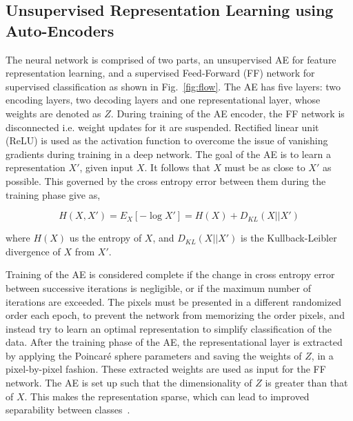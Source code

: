 \subsection{Unsupervised Representation Learning using Auto-Encoders}
\label{sec:AE_A5x}
The neural network is comprised of two parts, an unsupervised AE for feature representation learning, and a supervised Feed-Forward (FF) network for supervised classification as shown in Fig.~\ref{fig:flow}. 
%
The AE has five layers: two encoding layers, two decoding layers and one representational layer, whose weights are denoted as $Z$. During training of the AE encoder, the FF network is disconnected i.e. weight updates for it are suspended. Rectified linear unit (ReLU) is used as the activation function to overcome the issue of vanishing gradients during training in a deep network.
%
The goal of the AE is to learn a representation $X'$, given input $X$. It follows that $X$ must be as close to $X'$ as possible. This governed by the cross entropy error between them during the training phase give as,

\begin{equation}
H(X,X') = E_X[-\log X'] = H(X) + D_{KL}(X||X')
\end{equation}

where $H(X)$ us the entropy of $X$, and $D_{KL}(X||X')$ is the  Kullback-Leibler divergence of $X$ from $X'$.

Training of the AE is considered complete if the  change in cross entropy error between successive iterations is negligible, or if the maximum number of iterations are exceeded. The pixels must be presented in a different randomized order each epoch, to prevent the network from memorizing the order pixels, and instead try to learn an optimal representation to simplify classification of the data.
%
After the training phase of the AE, the representational layer is extracted by applying the Poincar\'e sphere parameters and saving the weights of $Z$, in a pixel-by-pixel fashion. These extracted weights are used as input for the FF network. The AE is set up such that the dimensionality of $Z$ is greater than that of $X$. This makes the representation sparse, which can lead to improved separability between classes~\cite{coates2011importance}. 

